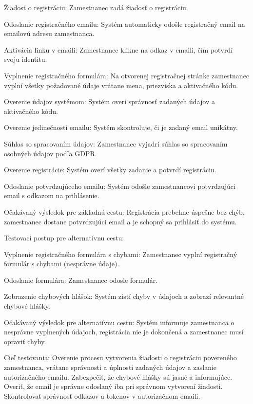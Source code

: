 \startitemize[n]
\item{Žiadosť o registráciu: Zamestnanec zadá žiadosť o registráciu.}
\item{Odoslanie registračného emailu: Systém automaticky odošle registračný email na emailovú adresu zamestnanca.}
\item{Aktivácia linku v emaili: Zamestnanec klikne na odkaz v emaili, čím potvrdí svoju identitu.}
\item{Vyplnenie registračného formulára: Na otvorenej registračnej stránke zamestnanec vyplní všetky požadované údaje vrátane mena, priezviska a aktivačného kódu.}
\item{Overenie údajov systémom: Systém overí správnosť zadaných údajov a aktivačného kódu.}
\item{Overenie jedinečnosti emailu: Systém skontroluje, či je zadaný email unikátny.}
\item{Súhlas so spracovaním údajov: Zamestnanec vyjadrí súhlas so spracovaním osobných údajov podľa GDPR.}
\item{Overenie registrácie: Systém overí všetky zadanie a potvrdí registráciu.}
\item{Odoslanie potvrdzujúceho emailu: Systém odošle zamestnancovi potvrdzujúci email s odkazom na prihlásenie.}
\stopitemize

Očakávaný výsledok pre základnú cestu: Registrácia prebehne úspešne bez chýb, zamestnanec dostane potvrdzujúci email a je schopný sa prihlásiť do systému.

\blank
Testovací postup pre alternatívnu cestu:

\startitemize[n]
\item{Vyplnenie registračného formulára s chybami: Zamestnanec vyplní registračný formulár s chybami (nesprávne údaje).}
\item{Odoslanie formulára: Zamestnanec odosle formulár.}
\item{Zobrazenie chybových hlášok: Systém zistí chyby v údajoch a zobrazí relevantné chybové hlášky.}
\stopitemize

Očakávaný výsledok pre alternatívnu cestu: Systém informuje zamestnanca o nesprávne vyplnených údajoch, registrácia nie je dokončená a zamestnanec musí opraviť chyby.


Cieľ testovania: Overenie procesu vytvorenia žiadosti o registráciu povereného zamestnanca, vrátane správnosti a úplnosti zadaných údajov a zaslanie autorizačného emailu. Zabezpečiť, že chybové hlášky sú jasné a informujúce. Overiť, že email je správne odoslaný iba pri správnom vytvorení žiadosti. Skontrolovať správnosť odkazov a tokenov v autorizačnom emaili.

